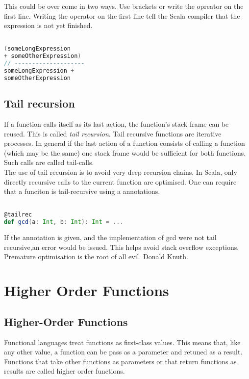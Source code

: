 \documentclass[10pt, a4paper]{report}
\begin{document}
This could be over come in two ways. Use brackets or write the opreator on the first line. Writing the operator on the first line tell the Scala compiler that the expression is not yet finished.

\begin{lstlisting}[language=scala]

(someLongExpression
+ someOtherExpression)
// --------------------
someLongExpression + 
someOtherExpression

\end{lstlisting}

\section{Tail recursion}

If a function calls itself as its last action, the function's stack frame can be reused. This is called \textit{tail recursion}. Tail recursive functions are iterative processes. In general if the last action of a function consists of calling a function (which may be the same) one stack frame would be sufficient for both functions. Such calls are called tail-calls.\\

The use of tail recursion is to avoid very deep recursion chains. In Scala, only directly recursive calls to the current function are optimised.  One can require that a funciton is tail-recursive using a annotations.

\begin{lstlisting}[language=scala]

@tailrec
def gcd(a: Int, b: Int): Int = ...

\end{lstlisting}

If the annotation is given, and the implementation of gcd were not tail recursive,an error would be issued. This helps avoid stack overflow exceptions. Premature optimisation is the root of all evil. Donald Knuth.

\chapter{Higher Order Functions}

\section{Higher-Order Functions}

Functional languages treat functions as first-class values. This means that, like any other value, a function can be pass as a parameter and retuned as a result. Functions that take other functions as parameters or that return functions as results are called higher order functions.
\end{document}
